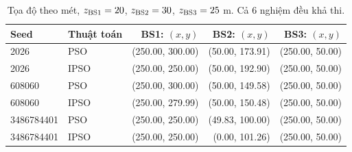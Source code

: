 \begin{table}
\centering
\renewcommand{\arraystretch}{1.16}
\setlength{\tabcolsep}{5pt}
\begin{tabular}{llrrr}
\toprule
Seed & Thuật toán & BS1: $(x,y)$ & BS2: $(x,y)$ & BS3: $(x,y)$ \\
\midrule
2026 & PSO & (250.00, 300.00) & (50.00, 173.91) & (250.00, 50.00) \\
2026 & IPSO & (250.00, 250.00) & (50.00, 192.90) & (250.00, 50.00) \\
608060 & PSO & (250.00, 300.00) & (50.00, 149.58) & (250.00, 50.00) \\
608060 & IPSO & (250.00, 279.99) & (50.00, 150.48) & (250.00, 50.00) \\
3486784401 & PSO & (250.00, 250.00) & (49.83, 100.00) & (250.00, 50.00) \\
3486784401 & IPSO & (250.00, 250.00) & (0.00, 101.26) & (250.00, 50.00) \\
\bottomrule
\end{tabular}
\caption{Tọa độ theo mét, $z_{\rm BS1}=20$, $z_{\rm BS2}=30$, $z_{\rm BS3}=25$ m. Cả 6 nghiệm đều khả thi.}
\end{table}
